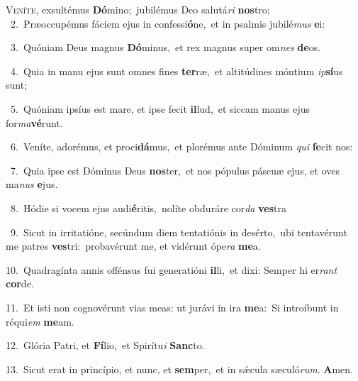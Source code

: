 \lettrine{\initial\textcolor{\initialcolor}{V}}{eníte,} exsultémus \textbf{Dó}\-mino;~\star jubilémus Deo salutá\textit{ri} \textbf{nos}\-tro;\\
{\numbfont\textcolor{\numbcolor}{~2.}}~Præoccupémus fáciem ejus in confessi\-\textbf{ó}\-ne,~\star et in psalmis jubilé\textit{mus} \textbf{e}\-i:\par
{\numbfont\textcolor{\numbcolor}{~3.}}~Quóniam Deus magnus \textbf{Dó}\-minus,~\star et rex magnus super om\textit{nes} \textbf{de}\-os.\par
{\numbfont\textcolor{\numbcolor}{~4.}}~Quia in manu ejus sunt omnes fines \textbf{ter}\-ræ,~\star et altitúdines móntium \textit{ip}\-\textbf{sí}us sunt;\par
{\numbfont\textcolor{\numbcolor}{~5.}}~Quóniam ipsíus est mare, et ipse fecit \textbf{il}\-lud,~\star et siccam manus ejus for\-\textit{ma}\-\textbf{vé}runt.\par
{\numbfont\textcolor{\numbcolor}{~6.}}~Veníte, adorémus, et proci\-\textbf{dá}\-mus,~\star et plorémus ante Dóminum \textit{qui} \textbf{fe}\-cit nos:\par
{\numbfont\textcolor{\numbcolor}{~7.}}~Quia ipse est Dóminus Deus \textbf{nos}\-ter,~\star et nos pópulus páscuæ ejus, et oves ma\textit{nus} \textbf{e}\-jus.\par
{\numbfont\textcolor{\numbcolor}{~8.}}~Hódie si vocem ejus audi\-\textbf{é}\-ritis,~\star nolíte obduráre cor\textit{da} \textbf{ves}\-tra\par
{\numbfont\textcolor{\numbcolor}{~9.}}~Sicut in irritatióne, secúndum diem tentatiónis in desérto,~\dagger ubi tentavérunt me patres \textbf{ves}\-tri:~\star probavérunt me, et vidérunt ópe\textit{ra} \textbf{me}\-a.\par
{\numbfont\textcolor{\numbcolor}{10.}}~Quadragínta annis offénsus fui generatióni \textbf{il}\-li,~\star et dixi: Semper hi er\textit{rant} \textbf{cor}\-de.\par
{\numbfont\textcolor{\numbcolor}{11.}}~Et isti non cognovérunt vias meas: ut jurávi in ira \textbf{me}\-a:~\star Si introíbunt in réqui\textit{em} \textbf{me}\-am.\par
{\numbfont\textcolor{\numbcolor}{12.}}~Glória Patri, et \textbf{Fí}\-lio,~\star et Spirítu\textit{i} \textbf{Sanc}\-to.\par
{\numbfont\textcolor{\numbcolor}{13.}}~Sicut erat in princípio, et nunc, et \textbf{sem}\-per,~\star et in sǽcula sæculó\-\textit{rum}\-. \textbf{A}\-men.\par
